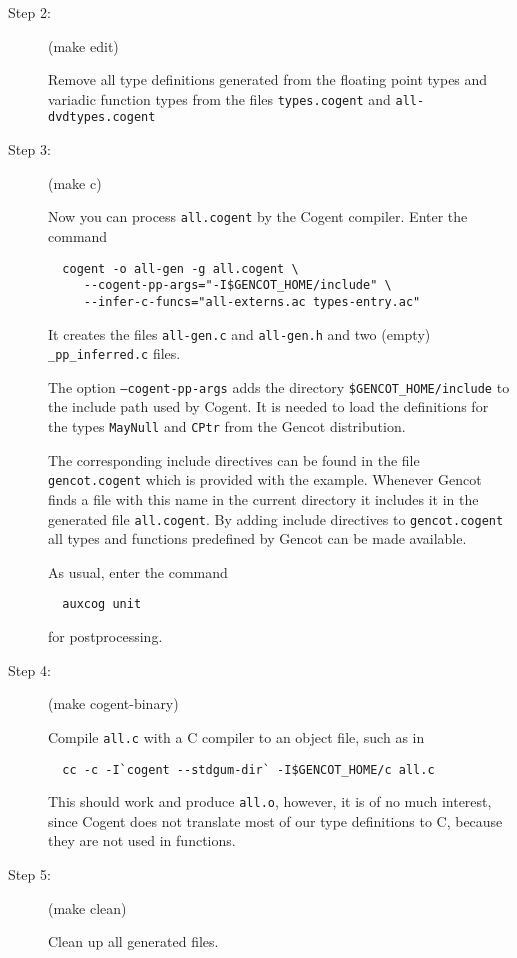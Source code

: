 \documentclass[a4paper]{report}
\newcommand{\code}[1]{\textnormal{\texttt{#1}}}
\begin{document}
\begin{description}
\item[Step 2:] (make edit)

Remove all type definitions generated from the floating point types and variadic function types 
from the files \code{types.cogent} and \code{all-dvdtypes.cogent}

\item[Step 3:] (make c)

Now you can process \code{all.cogent} by the Cogent compiler. Enter the command
\begin{verbatim}
  cogent -o all-gen -g all.cogent \
     --cogent-pp-args="-I$GENCOT_HOME/include" \
     --infer-c-funcs="all-externs.ac types-entry.ac"
\end{verbatim}
It creates the files \code{all-gen.c} and \code{all-gen.h} and two (empty) \code{\_pp\_inferred.c} files. 

The option \code{--cogent-pp-args} adds the directory \code{\$GENCOT\_HOME/include} to the include path
used by Cogent. It is needed to load the definitions for the types \code{MayNull} and \code{CPtr} from
the Gencot distribution. 

The corresponding include directives can be found in the file \code{gencot.cogent}
which is provided with the example. Whenever Gencot finds a file with this name in the current directory it 
includes it in the generated file \code{all.cogent}. By adding include directives to \code{gencot.cogent}
all types and functions predefined by Gencot can be made available.

As usual, enter the command
\begin{verbatim}
  auxcog unit
\end{verbatim}
for postprocessing.

\item[Step 4:] (make cogent-binary)

Compile \code{all.c} with a C compiler to an object file, such as in 
\begin{verbatim}
  cc -c -I`cogent --stdgum-dir` -I$GENCOT_HOME/c all.c
\end{verbatim}
This should work and produce \code{all.o}, however, it is of no much interest,
since Cogent does not translate most of our type definitions to C, because they are not used in functions.

\item[Step 5:] (make clean)

Clean up all generated files.
\end{description}
\end{document}
